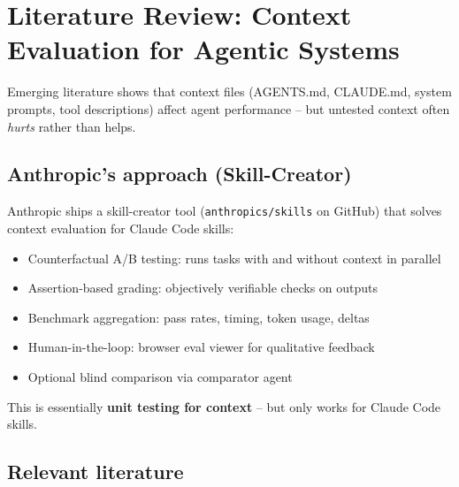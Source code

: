 
\newpage
\section{Literature Review: Context Evaluation for Agentic Systems}

Emerging literature shows that context files (AGENTS.md, CLAUDE.md, system prompts, tool descriptions) affect agent performance -- but untested context often \emph{hurts} rather than helps.

\subsection{Anthropic's approach (Skill-Creator)}

Anthropic ships a skill-creator tool (\texttt{anthropics/skills} on GitHub) that solves context evaluation for Claude Code skills:
\begin{itemize}
    \item Counterfactual A/B testing: runs tasks with and without context in parallel
    \item Assertion-based grading: objectively verifiable checks on outputs
    \item Benchmark aggregation: pass rates, timing, token usage, deltas
    \item Human-in-the-loop: browser eval viewer for qualitative feedback
    \item Optional blind comparison via comparator agent
\end{itemize}
This is essentially \textbf{unit testing for context} -- but only works for Claude Code skills.

\subsection{Relevant literature}

